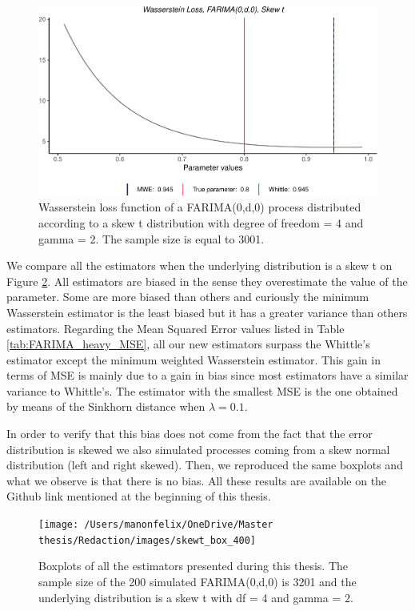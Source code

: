\documentclass[
  11pt,
]{article}
\begin{document}
\begin{figure}

{\centering \includegraphics[width=0.5\linewidth]{Master_thesis_V2_files/figure-latex/skew_t-1} 

}

\caption{Wasserstein loss function of a FARIMA(0,d,0) process distributed according to a skew t distribution with degree of freedom = 4 and gamma = 2. The sample size is equal to 3001.}\label{fig:skew_t}
\end{figure}

We compare all the estimators when the underlying distribution is a skew
t on Figure \ref{fig:box_farima_skewt}. All estimators are biased in the
sense they overestimate the value of the parameter. Some are more biased
than others and curiously the minimum Wasserstein estimator is the least
biased but it has a greater variance than others estimators. Regarding
the Mean Squared Error values listed in Table
\ref{tab:FARIMA_heavy_MSE}, all our new estimators surpass the Whittle's
estimator except the minimum weighted Wasserstein estimator. This gain
in terms of MSE is mainly due to a gain in bias since most estimators
have a similar variance to Whittle's. The estimator with the smallest
MSE is the one obtained by means of the Sinkhorn distance when
\(\lambda = 0.1\).

In order to verify that this bias does not come from the fact that the
error distribution is skewed we also simulated processes coming from a
skew normal distribution (left and right skewed). Then, we reproduced
the same boxplots and what we observe is that there is no bias. All
these results are available on the Github link mentioned at the
beginning of this thesis.

\begin{figure}[h]

{\centering \texttt{[image: /Users/manonfelix/OneDrive/Master thesis/Redaction/images/skewt\_box\_400]} 

}

\caption{Boxplots of all the estimators presented during this thesis. The sample size of the 200 simulated FARIMA(0,d,0) is 3201 and the underlying distribution is a skew t with df = 4 and gamma = 2.}\label{fig:box_farima_skewt}
\end{figure}
\end{document}
